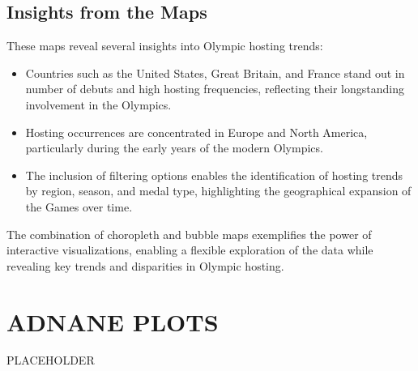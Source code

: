 \subsection{Insights from the Maps}

These maps reveal several insights into Olympic hosting trends:
\begin{itemize}
    \item Countries such as the United States, Great Britain, and France stand out in number of debuts and high hosting frequencies, reflecting their longstanding involvement in the Olympics.
    \item Hosting occurrences are concentrated in Europe and North America, particularly during the early years of the modern Olympics.
    \item The inclusion of filtering options enables the identification of hosting trends by region, season, and medal type, highlighting the geographical expansion of the Games over time.
\end{itemize}

The combination of choropleth and bubble maps exemplifies the power of interactive visualizations, enabling a flexible exploration of the data while revealing key trends and disparities in Olympic hosting.

\section{ADNANE PLOTS}

PLACEHOLDER
